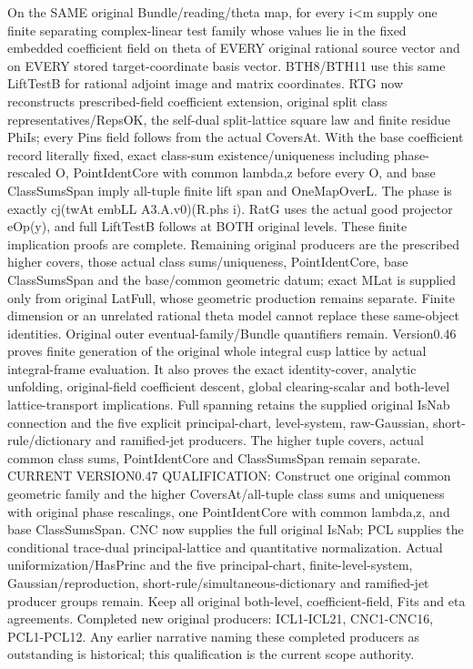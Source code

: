 \documentclass[11pt,a4paper]{article}
\numberwithin{equation}{section}
\theoremstyle{remark}\newtheorem{remark}[theorem]{Remark}
\begin{document}
On the SAME original Bundle/reading/theta map, for every i<m supply one finite separating complex-linear test family whose values lie in the fixed embedded coefficient field on theta of EVERY original rational source vector and on EVERY stored target-coordinate basis vector. BTH8/BTH11 use this same LiftTestB for rational adjoint image and matrix coordinates. RTG now reconstructs prescribed-field coefficient extension, original split class representatives/RepsOK, the self-dual split-lattice square law and finite residue PhiIs; every Pins field follows from the actual CoversAt. With the base coefficient record literally fixed, exact class-sum existence/uniqueness including phase-rescaled O, PointIdentCore with common lambda,z before every O, and base ClassSumsSpan imply all-tuple finite lift span and OneMapOverL. The phase is exactly cj(twAt embLL A3.A.v0)(R.phs i). RatG uses the actual good projector eOp(y), and full LiftTestB follows at BOTH original levels. These finite implication proofs are complete. Remaining original producers are the prescribed higher covers, those actual class sums/uniqueness, PointIdentCore, base ClassSumsSpan and the base/common geometric datum; exact MLat is supplied only from original LatFull, whose geometric production remains separate. Finite dimension or an unrelated rational theta model cannot replace these same-object identities. Original outer eventual-family/Bundle quantifiers remain. Version0.46 proves finite generation of the original whole integral cusp lattice by actual integral-frame evaluation. It also proves the exact identity-cover, analytic unfolding, original-field coefficient descent, global clearing-scalar and both-level lattice-transport implications. Full spanning retains the supplied original IsNab connection and the five explicit principal-chart, level-system, raw-Gaussian, short-rule/dictionary and ramified-jet producers. The higher tuple covers, actual common class sums, PointIdentCore and ClassSumsSpan remain separate. CURRENT VERSION0.47 QUALIFICATION: Construct one original common geometric family and the higher CoversAt/all-tuple class sums and uniqueness with original phase rescalings, one PointIdentCore with common lambda,z, and base ClassSumsSpan. CNC now supplies the full original IsNab; PCL supplies the conditional trace-dual principal-lattice and quantitative normalization. Actual uniformization/HasPrinc and the five principal-chart, finite-level-system, Gaussian/reproduction, short-rule/simultaneous-dictionary and ramified-jet producer groups remain. Keep all original both-level, coefficient-field, Fits and eta agreements. Completed new original producers: ICL1-ICL21, CNC1-CNC16, PCL1-PCL12. Any earlier narrative naming these completed producers as outstanding is historical; this qualification is the current scope authority.
\end{document}
